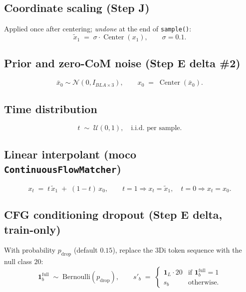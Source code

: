 \documentclass[11pt]{article}
\begin{document}
\subsection{Coordinate scaling (Step J)}
Applied once after centering; \emph{undone} at the end of \texttt{sample()}:
\begin{equation}
\tilde x_1 \;=\; \sigma \cdot \operatorname{Center}(x_1), \qquad \sigma = 0.1.
\end{equation}

\subsection{Prior and zero-CoM noise (Step E delta \#2)}
\begin{equation}
\bar x_0 \sim \mathcal{N}(0, I_{BLA\times 3}), \qquad x_0 \;=\; \operatorname{Center}(\bar x_0).
\end{equation}

\subsection{Time distribution}
\begin{equation}
t \;\sim\; \mathcal{U}(0,1), \quad \text{i.i.d.\ per sample.}
\end{equation}

\subsection{Linear interpolant (moco \texttt{ContinuousFlowMatcher})}
\begin{equation}
x_t \;=\; t\, \tilde x_1 \;+\; (1-t)\, x_0, \qquad t=1 \Rightarrow x_t=\tilde x_1, \quad t=0 \Rightarrow x_t=x_0.
\end{equation}

\subsection{CFG conditioning dropout (Step E delta, train-only)}
With probability $p_{\text{drop}}$ (default $0.15$), replace the 3Di token sequence with the null class $20$:
\begin{equation}
\mathbf{1}^{\text{full}}_b \;\sim\; \mathrm{Bernoulli}(p_{\text{drop}}), \qquad s'_b \;=\; \begin{cases} \mathbf{1}_{L} \cdot 20 & \text{if } \mathbf{1}^{\text{full}}_b = 1 \\ s_b & \text{otherwise.} \end{cases}
\end{equation}
\end{document}
